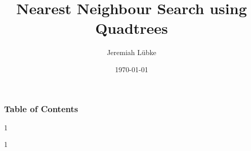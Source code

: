 \documentclass[mathserif]{beamer}
\title{Nearest Neighbour Search using Quadtrees}
\author{Jeremiah Lübke}
\date{\today}
\begin{document}
\frame{\titlepage}

\begin{frame}
    \frametitle{Table of Contents}
    \tableofcontents
\end{frame}







\setcounter{equation}{0}







%


\begin{frame}
\begin{animateinline}[%
    controls={step},
    buttonsize=10pt
]{1}
\end{animateinline}
\end{frame}


\begin{frame}
\begin{animateinline}[%
    controls={step},
    buttonsize=10pt
]{1}
\end{animateinline}
\end{frame}
\end{document}
